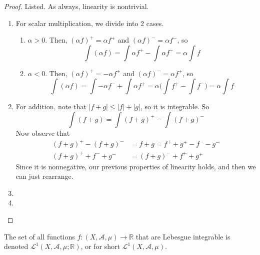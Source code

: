   \begin{proof}
    Listed. As always, linearity is nontrivial. 
    \begin{enumerate}
      \item For scalar multiplication, we divide into 2 cases. 
        \begin{enumerate}
          \item $\alpha > 0$. Then, $(\alpha f)^+ = \alpha f^+$ and $(\alpha f)^- = \alpha f^-$, so 
            \begin{equation}
              \int (\alpha f) = \int \alpha f^+ - \int \alpha f^- = \alpha \int f
            \end{equation}

          \item $\alpha < 0$. Then, $(\alpha f)^+ = - \alpha f^+$ and $(\alpha f)^- = \alpha f^+$, so 
            \begin{equation}
              \int (\alpha f) = \int -\alpha f^- + \int \alpha f^+ = \alpha \bigg( \int f^+ - \int f^- \bigg) = \alpha \int f
            \end{equation}
        \end{enumerate}
      \item For addition, note that $|f + g| \leq |f| + |g|$, so it is integrable. So 
        \begin{equation}
          \int (f + g) = \int (f + g)^+ - \int (f + g)^- 
        \end{equation}
        Now observe that 
        \begin{align}
          (f + g)^+ - (f + g)^- & = f + g = f^+ + g^+ - f^- - g^- \\ 
          (f + g)^+ + f^- + g^- & = (f + g)^- + f^+ + g^+ 
        \end{align}
        Since it is nonnegative, our previous properties of linearity holds, and then we can just rearrange. 
      \item 
      \item 
    \end{enumerate}
  \end{proof}

  \begin{definition}
    The set of all functions $f: (X, \mathcal{A}, \mu) \longrightarrow \mathbb{R}$ that are Lebesgue integrable is denoted $\mathcal{L}^1(X, \mathcal{A}, \mu; \mathbb{R})$, or for short $\mathcal{L}^1(X, \mathcal{A}, \mu)$. 
  \end{definition}

